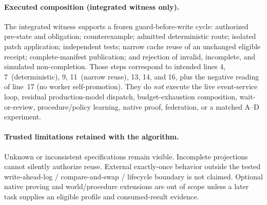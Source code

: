 \paragraph{Executed composition (integrated witness only).}
The integrated witness supports a frozen guard-before-write cycle:
authorized pre-state and obligation; counterexample; admitted deterministic
route; isolated patch application; independent tests; narrow cache reuse of an
unchanged eligible receipt; complete-manifest publication; and rejection of
invalid, incomplete, and simulated non-completion. Those steps correspond to
intended lines 4, 7~(deterministic), 9, 11~(narrow reuse), 13, 14, and 16, plus
the negative reading of line~17 (no worker self-promotion). They do \emph{not}
execute the live event-service loop, residual production-model dispatch,
budget-exhaustion composition, wait-or-review, procedure/policy learning, native
proof, federation, or a matched A--D experiment.

\paragraph{Trusted limitations retained with the algorithm.}
Unknown or inconsistent specifications remain visible. Incomplete projections
cannot silently authorize reuse. External exactly-once behavior outside the
tested write-ahead-log / compare-and-swap / lifecycle boundary is not claimed.
Optional native proving and world/procedure extensions are out of scope unless
a later task supplies an eligible profile and consumed-result evidence.
